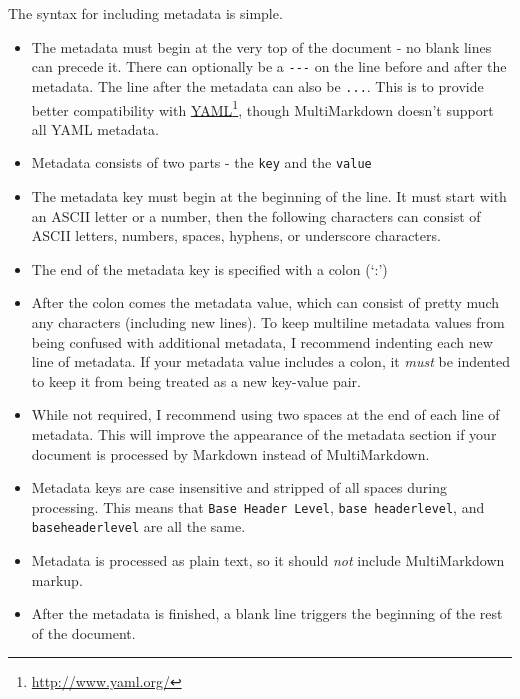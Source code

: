 The syntax for including metadata is simple.

\begin{itemize}
\item The metadata must begin at the very top of the document - no blank lines can precede it. There can optionally be a \texttt{-{}-{}-} on the line before and after the metadata. The line after the metadata can also be \texttt{...}. This is to provide better compatibility with \href{http://www.yaml.org/}{YAML}\footnote{\href{http://www.yaml.org/}{http:\slash \slash www.yaml.org\slash }}, though MultiMarkdown doesn't support all YAML metadata.

\item Metadata consists of two parts - the \texttt{key} and the \texttt{value}

\item The metadata key must begin at the beginning of the line. It must start with an ASCII letter or a number, then the following characters can consist of ASCII letters, numbers, spaces, hyphens, or underscore characters.

\item The end of the metadata key is specified with a colon (`:')

\item After the colon comes the metadata value, which can consist of pretty much any characters (including new lines). To keep multiline metadata values from being confused with additional metadata, I recommend indenting each new line of metadata. If your metadata value includes a colon, it \emph{must} be indented to keep it from being treated as a new key-value pair.

\item While not required, I recommend using two spaces at the end of each line of metadata. This will improve the appearance of the metadata section if your document is processed by Markdown instead of MultiMarkdown.

\item Metadata keys are case insensitive and stripped of all spaces during processing. This means that \texttt{Base Header Level}, \texttt{base headerlevel}, and \texttt{baseheaderlevel} are all the same.

\item Metadata is processed as plain text, so it should \emph{not} include MultiMarkdown markup.

\item After the metadata is finished, a blank line triggers the beginning of the rest of the document.

\end{itemize}

